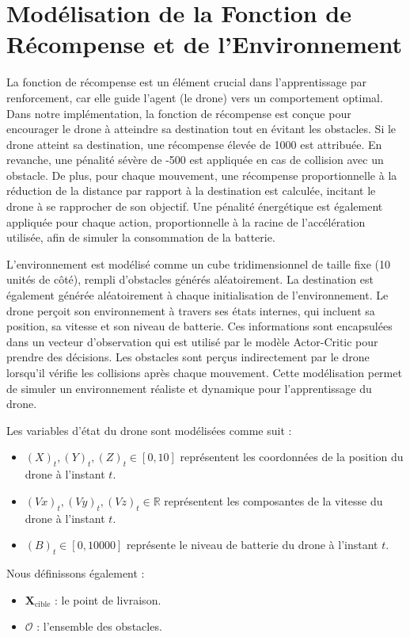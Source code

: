 \documentclass[a4paper, 12pt]{article}
\begin{document}
\section{Modélisation de la Fonction de Récompense et de l'Environnement}
La fonction de récompense est un élément crucial dans l'apprentissage par renforcement, car elle guide l'agent (le drone) vers un comportement optimal. Dans notre implémentation, la fonction de récompense est conçue pour encourager le drone à atteindre sa destination tout en évitant les obstacles. Si le drone atteint sa destination, une récompense élevée de 1000 est attribuée. En revanche, une pénalité sévère de -500 est appliquée en cas de collision avec un obstacle. De plus, pour chaque mouvement, une récompense proportionnelle à la réduction de la distance par rapport à la destination est calculée, incitant le drone à se rapprocher de son objectif. Une pénalité énergétique est également appliquée pour chaque action, proportionnelle à la racine de l'accélération utilisée, afin de simuler la consommation de la batterie.

L'environnement est modélisé comme un cube tridimensionnel de taille fixe (10 unités de côté), rempli d'obstacles générés aléatoirement. La destination est également générée aléatoirement à chaque initialisation de l'environnement. Le drone perçoit son environnement à travers ses états internes, qui incluent sa position, sa vitesse et son niveau de batterie. Ces informations sont encapsulées dans un vecteur d'observation qui est utilisé par le modèle Actor-Critic pour prendre des décisions. Les obstacles sont perçus indirectement par le drone lorsqu'il vérifie les collisions après chaque mouvement. Cette modélisation permet de simuler un environnement réaliste et dynamique pour l'apprentissage du drone.

Les variables d'état du drone sont modélisées comme suit :
\begin{itemize}
    \item $(X)_t, (Y)_t, (Z)_t \in [0, 10]$ représentent les coordonnées de la position du drone à l'instant $t$.
    \item $(Vx)_t, (Vy)_t, (Vz)_t \in \mathbb{R}$ représentent les composantes de la vitesse du drone à l'instant $t$.
    \item $(B)_t \in [0, 10000]$ représente le niveau de batterie du drone à l'instant $t$.
\end{itemize}

Nous définissons également :
\begin{itemize}
    \item $\mathbf{X}_{\text{cible}}$ : le point de livraison.
    \item $\mathcal{O}$ : l'ensemble des obstacles.
\end{itemize}
\end{document}
